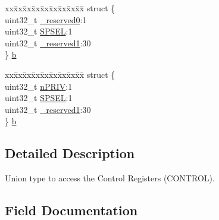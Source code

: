 \begin{DoxyCompactItemize}
\begin{tabbing}
\end{tabbing}\item 
\begin{tabbing}
xx\=xx\=xx\=xx\=xx\=xx\=xx\=xx\=xx\=\kill
struct \{\\
\>uint32\_t \hyperlink{union_c_o_n_t_r_o_l___type_ac8a6a13838a897c8d0b8bc991bbaf7c1}{\_reserved0}:1\\
\>uint32\_t \hyperlink{union_c_o_n_t_r_o_l___type_ae185aac93686ffc78e998a9daf41415b}{SPSEL}:1\\
\>uint32\_t \hyperlink{union_c_o_n_t_r_o_l___type_a959a73d8faee56599b7e792a7c5a2d16}{\_reserved1}:30\\
\} \hyperlink{union_c_o_n_t_r_o_l___type_a1aaf2022b762ebb6bdec99768b905056}{b}\\

\end{tabbing}\item 
\begin{tabbing}
xx\=xx\=xx\=xx\=xx\=xx\=xx\=xx\=xx\=\kill
struct \{\\
\>uint32\_t \hyperlink{union_c_o_n_t_r_o_l___type_a2a6e513e8a6bf4e58db169e312172332}{nPRIV}:1\\
\>uint32\_t \hyperlink{union_c_o_n_t_r_o_l___type_ae185aac93686ffc78e998a9daf41415b}{SPSEL}:1\\
\>uint32\_t \hyperlink{union_c_o_n_t_r_o_l___type_a959a73d8faee56599b7e792a7c5a2d16}{\_reserved1}:30\\
\} \hyperlink{union_c_o_n_t_r_o_l___type_ab0197b08e3cf49a0171c6bdfa2178593}{b}\\

\end{tabbing}\end{DoxyCompactItemize}


\subsection{Detailed Description}
Union type to access the Control Registers (C\+O\+N\+T\+R\+OL). 

\subsection{Field Documentation}
\mbox{\label{union_c_o_n_t_r_o_l___type_ac8a6a13838a897c8d0b8bc991bbaf7c1}} 
